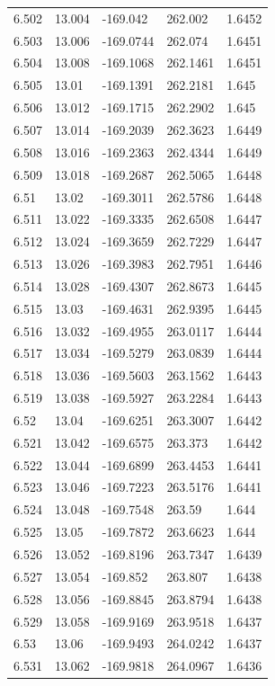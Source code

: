 \begin{tabular}{lllll}
6.502 & 13.004 & -169.042 & 262.002 & 1.6452 \\
6.503 & 13.006 & -169.0744 & 262.074 & 1.6451 \\
6.504 & 13.008 & -169.1068 & 262.1461 & 1.6451 \\
6.505 & 13.01 & -169.1391 & 262.2181 & 1.645 \\
6.506 & 13.012 & -169.1715 & 262.2902 & 1.645 \\
6.507 & 13.014 & -169.2039 & 262.3623 & 1.6449 \\
6.508 & 13.016 & -169.2363 & 262.4344 & 1.6449 \\
6.509 & 13.018 & -169.2687 & 262.5065 & 1.6448 \\
6.51 & 13.02 & -169.3011 & 262.5786 & 1.6448 \\
6.511 & 13.022 & -169.3335 & 262.6508 & 1.6447 \\
6.512 & 13.024 & -169.3659 & 262.7229 & 1.6447 \\
6.513 & 13.026 & -169.3983 & 262.7951 & 1.6446 \\
6.514 & 13.028 & -169.4307 & 262.8673 & 1.6445 \\
6.515 & 13.03 & -169.4631 & 262.9395 & 1.6445 \\
6.516 & 13.032 & -169.4955 & 263.0117 & 1.6444 \\
6.517 & 13.034 & -169.5279 & 263.0839 & 1.6444 \\
6.518 & 13.036 & -169.5603 & 263.1562 & 1.6443 \\
6.519 & 13.038 & -169.5927 & 263.2284 & 1.6443 \\
6.52 & 13.04 & -169.6251 & 263.3007 & 1.6442 \\
6.521 & 13.042 & -169.6575 & 263.373 & 1.6442 \\
6.522 & 13.044 & -169.6899 & 263.4453 & 1.6441 \\
6.523 & 13.046 & -169.7223 & 263.5176 & 1.6441 \\
6.524 & 13.048 & -169.7548 & 263.59 & 1.644 \\
6.525 & 13.05 & -169.7872 & 263.6623 & 1.644 \\
6.526 & 13.052 & -169.8196 & 263.7347 & 1.6439 \\
6.527 & 13.054 & -169.852 & 263.807 & 1.6438 \\
6.528 & 13.056 & -169.8845 & 263.8794 & 1.6438 \\
6.529 & 13.058 & -169.9169 & 263.9518 & 1.6437 \\
6.53 & 13.06 & -169.9493 & 264.0242 & 1.6437 \\
6.531 & 13.062 & -169.9818 & 264.0967 & 1.6436 \\

\end{tabular}
